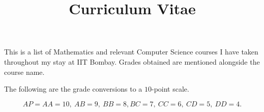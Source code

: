 \documentclass[a4paper,12pt,english]{curve}
\title{Curriculum Vitae}
\begin{document}
\makeheaders[c]

This is a list of Mathematics and relevant Computer Science courses I have taken throughout my stay at IIT Bombay. Grades obtained are mentioned alongside the course name.


\hrulefill

The following are the grade conversions to a $10$-point scale.

\begin{equation*}
  AP = AA = 10,~AB = 9,~BB = 8, BC = 7,~CC = 6,~CD = 5,~DD = 4.
\end{equation*}
\end{document}
